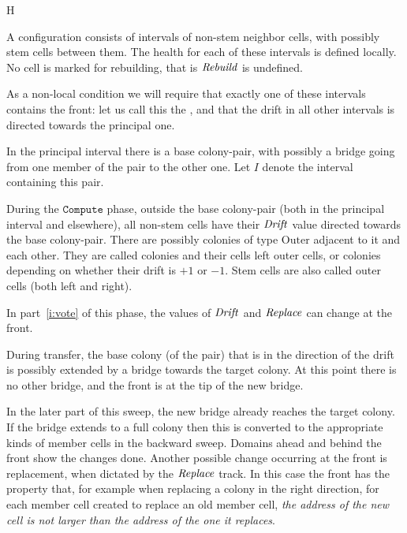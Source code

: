 \documentclass[11pt]{memoir}
\theoremstyle{definition} %
\newcommand{\fld}[1]{\ensuremath{\textit{#1\/}}}
\newcommand{\rul}[1]{\ensuremath{\texttt{#1}}}
\newcommand{\Drift}{\fld{Drift}}
\newcommand{\Rebuild}{\fld{Rebuild}} %
\newcommand{\Replace}{\fld{Replace}}
\newcommand{\Outer}{\mathrm{Outer}}
\newcommand{\Compute}{\rul{Compute}}
\begin{document}
\begin{varenum}{H}
\item   A configuration consists of intervals of non-stem neighbor cells,
  with possibly stem cells between them.
  The health for each of these intervals is defined locally.
  No cell is marked for rebuilding, that is \( \Rebuild \) is undefined.

  As a non-local condition we will require that exactly one of these intervals contains
  the front: let us call this the ,
  and that the drift in all other intervals is directed towards the principal one.
 
\item  In the principal interval
  there is a base colony-pair, with possibly a bridge going from one member of the pair
  to the other one.
  Let \( I \) denote the interval containing this pair.

\item During the \( \Compute \) phase,
  outside the base colony-pair (both in the principal interval and elsewhere),
  all non-stem cells have their \( \Drift \) value directed towards the base colony-pair.
  There are possibly colonies of type \( \Outer \) adjacent to it and each other.
  They are called  colonies and their cells left outer cells, or
   colonies depending on whether their drift is \( +1 \) or \( -1 \).
  Stem cells are also called outer cells (both left and right).

  In part~\ref{i:vote} of this phase, the values of \( \Drift \) and \( \Replace \) can change at the front.
  
\item\label{i:health.transfer}  During transfer, the base colony (of the pair)
  that is in the direction of the drift is possibly extended by a bridge towards the target colony.
  At this point there is no other bridge, and the front is at the tip of the new bridge.
  
  In the later part of this sweep, the new bridge already reaches the target colony.
  If the bridge extends to a full colony then this is converted to the appropriate kinds of member
  cells in the backward sweep.
  Domains ahead and behind the front show the changes done.
  Another possible change occurring at the front is replacement, when dictated by the \( \Replace \) track.
  In this case the front has the property that, for example when replacing a colony in the right direction,
  for each member cell created to replace an old member cell, \emph{the address of the new cell is not
    larger than the address of the one it replaces}.


\end{varenum}
\end{document}
